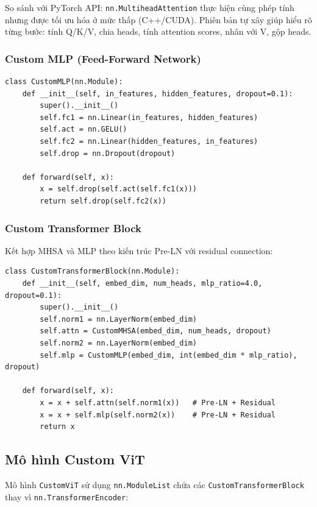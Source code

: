 \documentclass[a4paper]{article}
\newcommand{\code}[1]{\texttt{\textcolor{blue!80!black}{#1}}}
\theoremstyle{definition}
\begin{document}
So sánh với PyTorch API: \code{nn.MultiheadAttention} thực hiện cùng phép tính nhưng được tối ưu hóa ở mức thấp (C++/CUDA). Phiên bản tự xây giúp hiểu rõ từng bước: tính Q/K/V, chia heads, tính attention scores, nhân với V, gộp heads.

\subsubsection{Custom MLP (Feed-Forward Network)}
\begin{verbatim}
class CustomMLP(nn.Module):
    def __init__(self, in_features, hidden_features, dropout=0.1):
        super().__init__()
        self.fc1 = nn.Linear(in_features, hidden_features)
        self.act = nn.GELU()
        self.fc2 = nn.Linear(hidden_features, in_features)
        self.drop = nn.Dropout(dropout)

    def forward(self, x):
        x = self.drop(self.act(self.fc1(x)))
        return self.drop(self.fc2(x))
\end{verbatim}

\subsubsection{Custom Transformer Block}
Kết hợp MHSA và MLP theo kiến trúc Pre-LN với residual connection:

\begin{verbatim}
class CustomTransformerBlock(nn.Module):
    def __init__(self, embed_dim, num_heads, mlp_ratio=4.0, dropout=0.1):
        super().__init__()
        self.norm1 = nn.LayerNorm(embed_dim)
        self.attn = CustomMHSA(embed_dim, num_heads, dropout)
        self.norm2 = nn.LayerNorm(embed_dim)
        self.mlp = CustomMLP(embed_dim, int(embed_dim * mlp_ratio), dropout)

    def forward(self, x):
        x = x + self.attn(self.norm1(x))   # Pre-LN + Residual
        x = x + self.mlp(self.norm2(x))    # Pre-LN + Residual
        return x
\end{verbatim}

\subsection{Mô hình Custom ViT}
Mô hình \code{CustomViT} sử dụng \code{nn.ModuleList} chứa các \code{CustomTransformerBlock} thay vì \code{nn.TransformerEncoder}:
\end{document}

